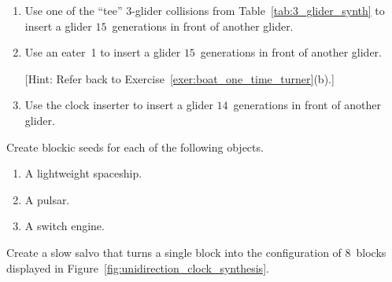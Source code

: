 \begin{multicols}{2}
\begin{problemstar}
		\begin{enumerate}[label=\bf\color{ocre}(\alph*)]
			\item Use one of the ``tee'' $3$-glider collisions from Table~\ref{tab:3_glider_synth} to insert a glider $15$~generations in front of another glider.
			
			\item Use an eater~1 to insert a glider $15$~generations in front of another glider.
			
			[Hint: Refer back to Exercise~\ref{exer:boat_one_time_turner}(b).]
			
			\item Use the clock inserter to insert a glider $14$~generations in front of another glider.
		\end{enumerate}
	\end{problemstar}
	
	
	\mfilbreak
	
	
	\begin{problem}\label{exer:other_blockic} 
		Create blockic seeds for each of the following objects.
		
		\smallskip
		
		\begin{enumerate}[label=\bf\color{ocre}(\alph*)]
			\item A lightweight spaceship.
			
			\item A pulsar.
			
			\item A switch engine.
		\end{enumerate}
	\end{problem}
	
	
	\mfilbreak
	
	
	\begin{problem}\label{exer:create_clock_turners} 
		Create a slow salvo that turns a single block into the configuration of $8$~blocks displayed in Figure~\ref{fig:unidirection_clock_synthesis}.
		
	\end{problem}
	

\end{multicols}
